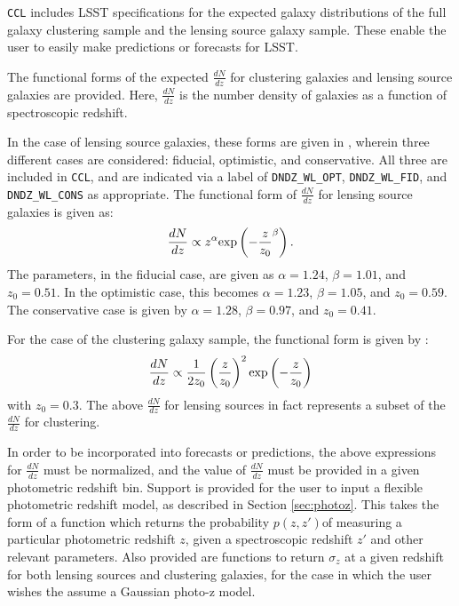 \documentclass[\docopts]{\docclass}
\begin{document}
{\tt CCL} includes LSST specifications for the expected galaxy distributions of the full galaxy clustering sample and the lensing source galaxy sample. These enable the user to easily make predictions or forecasts for LSST.

The functional forms of the expected $\frac{dN}{dz}$ for clustering galaxies and lensing source galaxies are provided. Here, $\frac{dN}{dz}$ is the number density of galaxies as a function of spectroscopic redshift. 

In the case of lensing source galaxies, these forms are given in \cite{Chang2013}, wherein three different cases are considered: fiducial, optimistic, and conservative. All three are included in {\tt CCL}, and are indicated via a label of {\tt DNDZ\_WL\_OPT}, {\tt DNDZ\_WL\_FID}, and {\tt DNDZ\_WL\_CONS} as appropriate. The functional form of $\frac{dN}{dz}$ for lensing source galaxies is given as:
\begin{equation}
\frac{dN}{dz} \propto z^\alpha {\rm exp}\left(-\frac{z}{z_0}^\beta\right).
\label{dndz_src}
\end{equation}
The parameters, in the fiducial case, are given as $\alpha=1.24$, $\beta=1.01$, and $z_0=0.51$. In the optimistic case, this becomes $\alpha=1.23$, $\beta=1.05$, and $z_0=0.59$. The conservative case is given by $\alpha=1.28$, $\beta=0.97$, and $z_0=0.41$. 

For the case of the clustering galaxy sample, the functional form is given by \cite{ScienceBook}:
\begin{equation}
\frac{dN}{dz} \propto \frac{1}{2z_0}\left(\frac{z}{z_0}\right)^2 {\rm exp}\left(-\frac{z}{z_0}\right)
\label{dndz_clust}
\end{equation}
with $z_0=0.3$. The above $\frac{dN}{dz}$ for lensing sources in fact represents a subset of the $\frac{dN}{dz}$ for clustering.

In order to be incorporated into forecasts or predictions, the above expressions for $\frac{dN}{dz}$ must be normalized, and the value of $\frac{dN}{dz}$ must be provided in a given photometric redshift bin. Support is provided for the user to input a flexible photometric redshift model, as described in Section \ref{sec:photoz}. This takes the form of a function which returns the probability $p(z,z')$of measuring a particular photometric redshift $z$, given a spectroscopic redshift $z'$ and other relevant parameters. Also provided are functions to return $\sigma_z$ at a given redshift for both lensing sources and clustering galaxies, for the case in which the user wishes the assume a Gaussian photo-z model.
\end{document}
